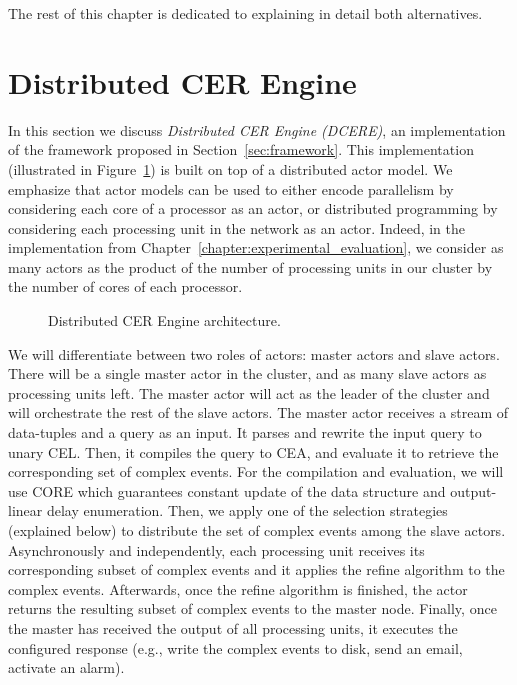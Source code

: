The rest of this chapter is dedicated to explaining in detail both alternatives.

\section{Distributed CER Engine}\label{sec:dcere}

In this section we discuss \emph{Distributed CER Engine (DCERE)}, an implementation of the framework proposed in Section~\ref{sec:framework}. This implementation (illustrated in Figure~\ref{fig:dcere}) is built on top of a distributed actor model. We emphasize that actor models can be used to either encode parallelism by considering each core of a processor as an actor, or distributed programming by considering each processing unit in the network as an actor. Indeed, in the implementation from Chapter~\ref{chapter:experimental_evaluation}, we consider as many actors as the product of the number of processing units in our cluster by the number of cores of each processor.

\begin{figure}[t]
  \centering
  \caption{Distributed CER Engine architecture.}
  \label{fig:dcere}
\end{figure}

We will differentiate between two roles of actors: master actors and slave actors. There will be a single master actor in the cluster, and as many slave actors as processing units left. The master actor will act as the leader of the cluster and will orchestrate the rest of the slave actors. The master actor receives a stream of data-tuples and a query as an input. It parses and rewrite the input query to unary CEL. Then, it compiles the query to CEA, and evaluate it to retrieve the corresponding set of complex events. For the compilation and evaluation, we will use CORE \cite{core} which guarantees constant update of the data structure and output-linear delay enumeration. Then, we apply one of the selection strategies (explained below) to distribute the set of complex events among the slave actors. Asynchronously and independently, each processing unit receives its corresponding subset of complex events and it applies the refine algorithm to the complex events. Afterwards, once the refine algorithm is finished, the actor returns the resulting subset of complex events to the master node. Finally, once the master has received the output of all processing units, it executes the configured response (e.g., write the complex events to disk, send an email, activate an alarm).


